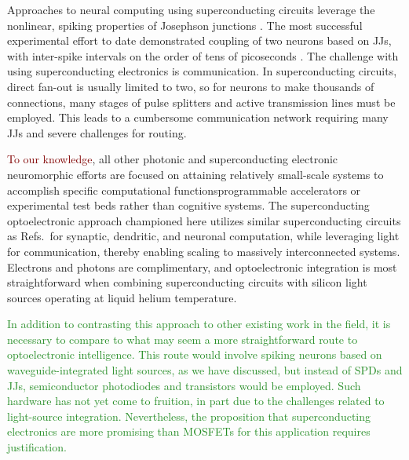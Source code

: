 \documentclass[twocolumn]{article}
\newcommand{\onlinecite}[1]{\hspace{-1 ex} \nocite{#1}\citenum{#1}}
\begin{document}
{Approaches to neural computing using superconducting circuits leverage the nonlinear, spiking properties of Josephson junctions \cite{hias2007,sele2017,scdo2018}. The most successful experimental effort to date demonstrated coupling of two neurons based on JJs, with inter-spike intervals on the order of tens of picoseconds \cite{sele2017}. The challenge with using superconducting electronics is communication. In superconducting circuits, direct fan-out is usually limited to two, so for neurons to make thousands of connections, many stages of pulse splitters and active transmission lines must be employed. This leads to a cumbersome communication network requiring many JJs and severe challenges for routing. 

\textcolor{Maroon}{To our knowledge}, all other photonic and superconducting electronic neuromorphic efforts are focused on attaining relatively small-scale systems to accomplish specific computational functions\textemdash programmable accelerators or experimental test beds rather than cognitive systems. The superconducting optoelectronic approach championed here utilizes similar superconducting circuits as Refs.\,\onlinecite{hias2007,sele2017,scdo2018} for synaptic, dendritic, and neuronal computation, while leveraging light for communication, thereby enabling scaling to massively interconnected systems. Electrons and photons are complimentary, and optoelectronic integration is most straightforward when combining superconducting circuits with silicon light sources operating at liquid helium temperature.

\textcolor{ForestGreen}{In addition to contrasting this approach to other existing work in the field, it is necessary to compare to what may seem a more straightforward route to optoelectronic intelligence. This route would involve spiking neurons based on waveguide-integrated light sources, as we have discussed, but instead of SPDs and JJs, semiconductor photodiodes and transistors would be employed. Such hardware has not yet come to fruition, in part due to the challenges related to light-source integration. Nevertheless, the proposition that superconducting electronics are more promising than MOSFETs for this application requires justification.}

}
\end{document}
